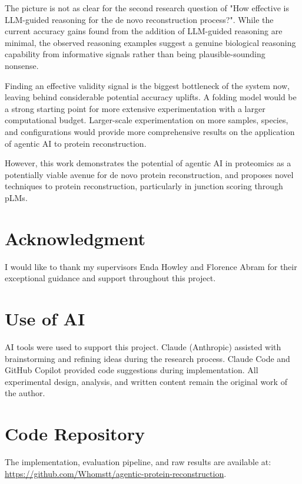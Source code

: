 \documentclass[journal]{IEEEtran}
\begin{document}
The picture is not as clear for the second research question of "How effective is LLM-guided reasoning for the de novo reconstruction process?".
While the current accuracy gains found from the addition of LLM-guided reasoning are minimal,
the observed reasoning examples suggest a genuine biological reasoning capability from informative signals
rather than being plausible-sounding nonsense.

Finding an effective validity signal is the biggest bottleneck of the system now, leaving behind considerable potential accuracy uplifts.
A folding model
would be a strong starting point for more extensive experimentation with a larger computational budget. Larger-scale experimentation
on more samples, species, and configurations would provide more comprehensive results on the application of agentic AI to protein reconstruction.

However, this work demonstrates the potential of agentic AI in proteomics as a potentially viable avenue for de novo protein reconstruction,
and proposes novel techniques to protein reconstruction, particularly in junction scoring through pLMs.

\section*{Acknowledgment}
I would like to thank my supervisors Enda Howley and Florence Abram for their exceptional guidance and support throughout this project.


\section*{Use of AI}
AI tools were used to support this project. Claude (Anthropic) assisted with brainstorming and refining ideas during the research process. Claude Code and GitHub Copilot provided code suggestions during implementation. All experimental design, analysis, and written content remain the original work of the author.

\section*{Code Repository}
The implementation, evaluation pipeline, and raw results are available at:\\
\url{https://github.com/Whomstt/agentic-protein-reconstruction}.

\ifCLASSOPTIONcaptionsoff
  \newpage
\fi



\end{document}
